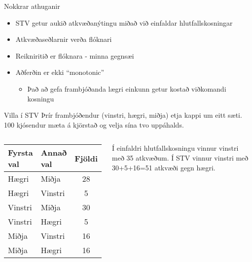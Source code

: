 \documentclass{beamer}
\begin{document}
\begin{frame}{Nokkrar athuganir}
    \begin{itemize}
        \item STV getur aukið atkvæðanýtingu miðað við einfaldar hlutfallskosningar
        \item Atkvæðaseðlarnir verða flóknari
        \item Reikniritið er flóknara - minna gegnsæi
        \item Aðferðin er ekki ``monotonic''
        \begin{itemize}
            \item Það að gefa frambjóðanda lægri einkunn getur kostað viðkomandi kosningu
        \end{itemize}
    \end{itemize}
\end{frame}

\begin{frame}{Villa í STV}
    Þrír frambjóðendur (vinstri, hægri, miðja) etja kappi um eitt sæti. 100 kjósendur mæta á kjörstað og velja sína tvo uppáhalds.
    \vspace{0.5cm}
    \begin{columns}
        \begin{center}
            \begin{tabular}{llc}
                \toprule
                Fyrsta val&Annað val&Fjöldi\\
                \midrule
                Hægri 	&Miðja& 	28\\
                Hægri 	&Vinstri &	5\\
                Vinstri 	&Miðja& 	30\\
                Vinstri 	&Hægri &	5\\
                Miðja 	&Vinstri &	16\\
                Miðja 	&Hægri &	16\\
                \bottomrule
            \end{tabular}
        \end{center}
        Í einfaldri hlutfallskosningu vinnur vinstri með 35 atkvæðum. Í STV vinnur vinstri með 30+5+16=51 atkvæði gegn hægri.
    \end{columns}
\end{frame}
\end{document}
